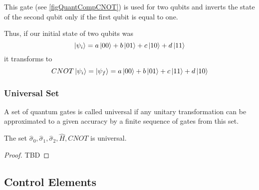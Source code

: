 This gate (see \autoref{figQuantCompCNOT}) is used for two qubits and inverts the state of the second qubit only if the first qubit is equal to one.



Thus, if our initial state of two qubits was
\[
\ket{\psi_i} = a \ket{00} + b \ket{01} + c \ket{10} + d \ket{11}
\]
it transforms to
\[
CNOT \ket{\psi_i} = \ket{\psi_f} = 
a \ket{00} + b \ket{01} + c \ket{11} + d \ket{10}
\]

\subsubsection{Universal Set}

\begin{definition}
A set of quantum gates is called universal if any unitary transformation can be approximated to a given accuracy by a finite sequence of gates from this set.
\end{definition}

\begin{theorem}[Kitaev]
The set $\hat{\sigma}_0, \hat{\sigma}_1,
\hat{\sigma}_2, \hat{H}, CNOT$ is universal.
\begin{proof}
TBD
\end{proof}
\end{theorem}

\subsection{Control Elements}



